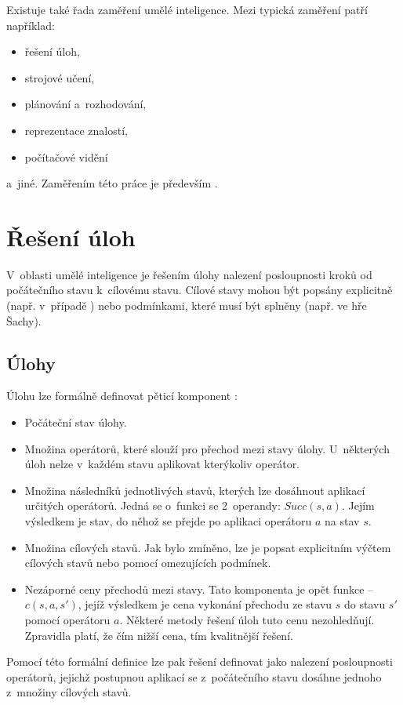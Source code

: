 Existuje také řada zaměření umělé inteligence. Mezi typická zaměření patří například:
\begin{itemize}
    \item řešení úloh,
    \item strojové učení,
    \item plánování a~rozhodování,
    \item reprezentace znalostí,
    \item počítačové vidění
\end{itemize}
a~jiné. Zaměřením této práce je především  .


\section{Řešení úloh}

V~oblasti umělé inteligence je řešením úlohy nalezení posloupnosti kroků od počátečního stavu k~cílovému stavu. Cílové stavy mohou být popsány explicitně (např. v~případě ) nebo podmínkami, které musí být splněny (např.  ve hře Šachy).

\subsection*{Úlohy}

Úlohu lze formálně definovat pěticí komponent \cite{AI_Russel_Norvig}:
\begin{itemize}
    \item Počáteční stav úlohy.
    \item Množina operátorů, které slouží pro přechod mezi stavy úlohy. U~některých úloh nelze v~každém stavu aplikovat kterýkoliv operátor.
    \item Množina následníků jednotlivých stavů, kterých lze dosáhnout aplikací určitých operátorů. Jedná se o~funkci se 2~operandy: ${Succ(s, a)}$. Jejím výsledkem je stav, do něhož se přejde po aplikaci operátoru $a$ na stav $s$.
    \item Množina cílových stavů. Jak bylo zmíněno, lze je popsat explicitním výčtem cílových stavů nebo pomocí omezujících podmínek.
    \item Nezáporné ceny přechodů mezi stavy. Tato komponenta je opět funkce -- ${c(s, a, s')}$, jejíž výsledkem je cena vykonání přechodu ze stavu $s$ do stavu $s'$ pomocí operátoru $a$. Některé metody řešení úloh tuto cenu nezohledňují. Zpravidla platí, že čím nižší cena, tím kvalitnější řešení.
\end{itemize}
Pomocí této formální definice lze pak řešení definovat jako nalezení posloupnosti operátorů, jejichž postupnou aplikací se z~počátečního stavu dosáhne jednoho z~množiny cílových stavů.


